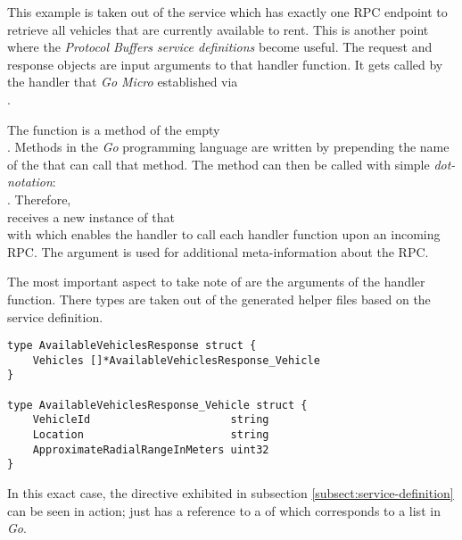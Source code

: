 \documentclass[12pt,a4paper,twoside]{report}
\begin{document}
This example is taken out of the  service which has
exactly one RPC endpoint to retrieve all vehicles that are currently available
to rent. This is another point where the \textit{Protocol Buffers service definitions}
become useful. The request and response objects are input arguments to that
handler function. It gets called by the handler that \textit{Go Micro} established via\\
.

The function  is a method of the empty\\
 . Methods in the \textit{Go} programming
language are written by prepending the name of the  that can
call that method. The method can then be called with simple \textit{dot-notation}:\\
.
Therefore, \\ receives a new instance of that\\
  with  which enables
the handler to call each handler function upon an incoming RPC.
The  argument is used for additional meta-information about the RPC.

The most important aspect to take note of are the arguments of the handler function.
There types are taken out of the generated helper files based on the service definition.

\begin{lstlisting}[title=services/fleet-monitor/proto/fleet-monitor.pb.go]
type AvailableVehiclesResponse struct {
	Vehicles []*AvailableVehiclesResponse_Vehicle
}

type AvailableVehiclesResponse_Vehicle struct {
	VehicleId                      string
	Location                       string
	ApproximateRadialRangeInMeters uint32
}
\end{lstlisting}

In this exact case, the  directive exhibited in subsection
\ref{subsect:service-definition} can be seen in action;
 just has a reference to a  of
 which corresponds to a list in \textit{Go}.
\end{document}
